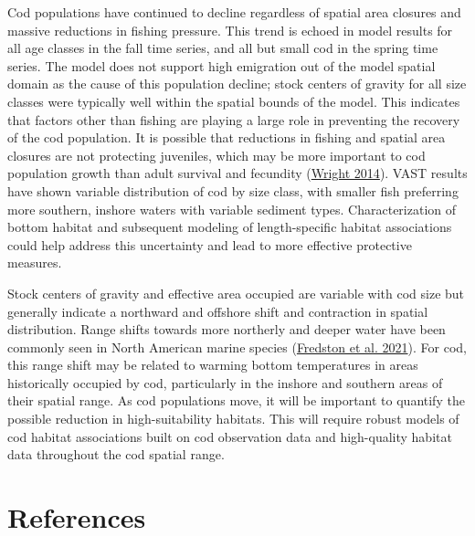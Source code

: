 \documentclass[
]{article}
\begin{document}
Cod populations have continued to decline regardless of spatial area closures and massive reductions in fishing pressure. This trend is echoed in model results for all age classes in the fall time series, and all but small cod in the spring time series. The model does not support high emigration out of the model spatial domain as the cause of this population decline; stock centers of gravity for all size classes were typically well within the spatial bounds of the model. This indicates that factors other than fishing are playing a large role in preventing the recovery of the cod population. It is possible that reductions in fishing and spatial area closures are not protecting juveniles, which may be more important to cod population growth than adult survival and fecundity (\protect\hyperlink{ref-wright_2014}{Wright 2014}). VAST results have shown variable distribution of cod by size class, with smaller fish preferring more southern, inshore waters with variable sediment types. Characterization of bottom habitat and subsequent modeling of length-specific habitat associations could help address this uncertainty and lead to more effective protective measures.

Stock centers of gravity and effective area occupied are variable with cod size but generally indicate a northward and offshore shift and contraction in spatial distribution. Range shifts towards more northerly and deeper water have been commonly seen in North American marine species (\protect\hyperlink{ref-fredston_2021}{Fredston et al. 2021}). For cod, this range shift may be related to warming bottom temperatures in areas historically occupied by cod, particularly in the inshore and southern areas of their spatial range. As cod populations move, it will be important to quantify the possible reduction in high-suitability habitats. This will require robust models of cod habitat associations built on cod observation data and high-quality habitat data throughout the cod spatial range.

\hypertarget{references}{%
\section*{References}\label{references}}
\end{document}
